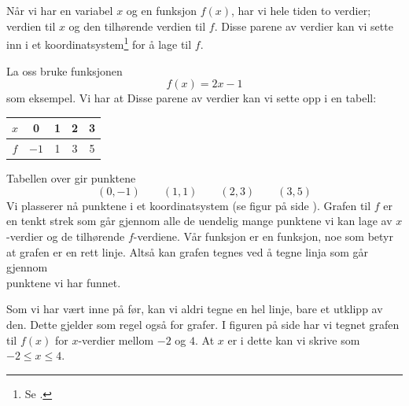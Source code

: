 \section{\lingraf}
Når vi har en variabel $ x $ og en funksjon $ f(x) $, har vi hele tiden to verdier; verdien til $ x $ og den tilhørende verdien til $ f $. Disse parene av verdier kan vi sette inn i et koordinatsystem\footnote{Se .} for å lage  til $ f $. \vsk

La oss bruke funksjonen 
\[ f(x)=2x-1 \]
som eksempel. Vi har at
Disse parene av verdier kan vi sette opp i en tabell:
	\begin{center}
	\begin{tabular}{c | c |c |c|c}
		$ x $ & 0 & 1 & 2 & 3 \\ \hline
		$ f $ &$  -1 $ & 1&3 &5
	\end{tabular}
\end{center}
Tabellen over gir punktene
\[ (0, -1)\quad\quad(1, 1)\quad\quad(2, 3)\quad\quad(3, 5) \]
Vi plasserer nå punktene i et koordinatsystem (se figur på side \pageref{funkfig}). Grafen til $ f $ er en tenkt strek som går gjennom alle de uendelig mange punktene vi kan lage av $ x$-verdier og de tilhørende $ f$-verdiene. Vår funksjon er en  funksjon, noe som betyr at grafen er en rett linje. Altså kan grafen tegnes ved å tegne linja som går gjennom\\ punktene vi har funnet.\vsk

Som vi har vært inne på før, kan vi aldri tegne en hel linje, bare et utklipp av den. Dette gjelder som regel også for grafer. I figuren på side \pageref{funkfig} har vi tegnet grafen til $ f(x) $ for $ x $-verdier mellom $ -2 $ og $ 4 $. At $ x $ er i dette  kan vi skrive som $ -2\leq x\leq 4 $.
 \label{funkfig}

